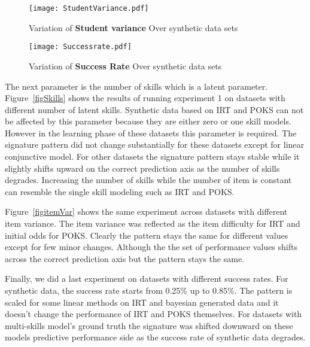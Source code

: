 \begin{figure}
  \centering
    \texttt{[image: StudentVariance.pdf]}
\caption{Variation of \textbf{Student variance} Over synthetic data sets}
\label{figStudentVar}
\end{figure}


\begin{figure}
  \centering
    \texttt{[image: Successrate.pdf]}
\caption{Variation of \textbf{Success Rate} Over synthetic data sets}
\label{figSucceessRate}
\end{figure}

The next parameter is the number of skills which is a latent parameter. Figure~\ref{figSkills} shows the results of running experiment 1 on datasets with different number of latent skills. Synthetic data based on IRT and POKS can not be affected by this parameter because they are either zero or one skill models. However in the learning phase of these datasets this parameter is required. The signature pattern did not change substantially for these datasets except for linear conjunctive model. For other datasets the signature pattern stays stable while it slightly shifts upward on the correct prediction axis as the number of skills degrades. Increasing the number of skills while the number of item is constant can resemble the single skill modeling such as IRT and POKS. 


Figure~\ref{figitemVar} shows the same experiment across datasets with different item variance. The item variance was reflected as the item difficulty for IRT and initial odds for POKS. Clearly the pattern stays the same for different values except for few minor changes. Although the the set of performance values shifts across the correct prediction axis but the pattern stays the same.

Finally, we did a last experiment on datasets with different success rates. For synthetic data, the success rate starts from 0.25\% up to 0.85\%. The pattern is scaled for some linear methods on IRT and bayesian generated data and it doesn't change the performance of IRT and POKS themselves. For datasets with multi-skills model's ground truth the signature was shifted downward on these models predictive performance side as the success rate of synthetic data degrades.




